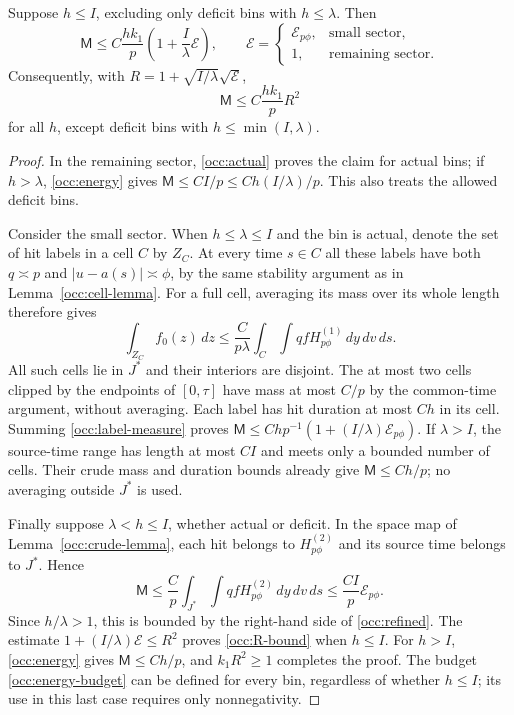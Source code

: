 \begin{proposition}\label{occ:refined-proposition}
Suppose $h\leq I$, excluding only deficit bins with $h\leq\lambda$.
Then
\begin{equation}\label{occ:refined}
 \mathsf M\leq C\frac{hk_1}{p}
             \left(1+\frac I\lambda\mathcal E\right),
 \qquad
 \mathcal E=\begin{cases}
  \mathcal E_{p\phi},&\text{small sector},\\
  1,&\text{remaining sector}.
 \end{cases}
\end{equation}
Consequently, with
$R=1+\sqrt{I/\lambda}\sqrt{\mathcal E}$,
\begin{equation}\label{occ:R-bound}
 \mathsf M\leq C\frac{hk_1}{p}R^2
\end{equation}
for all $h$, except deficit bins with $h\leq\min(I,\lambda)$.
\end{proposition}

\begin{proof}
In the remaining sector, \eqref{occ:actual} proves the claim for actual
bins; if $h>\lambda$, \eqref{occ:energy} gives
$\mathsf M\leq CI/p\leq Ch(I/\lambda)/p$. This also treats the allowed
deficit bins.

Consider the small sector. When $h\leq\lambda\leq I$ and the bin is
actual, denote the set of hit labels in a cell $C$ by $Z_C$. At every
time $s\in C$ all these labels have both $q\asymp p$ and
$|u-a(s)|\asymp\phi$, by the same stability argument as in
Lemma~\ref{occ:cell-lemma}. For a full cell, averaging its mass over its
whole length therefore gives
\[
 \int_{Z_C}f_0(z)\,dz
 \leq\frac C{p\lambda}\int_C\int qf
                  H^{(1)}_{p\phi}\,dy\,dv\,ds.
\]
All such cells lie in $J^*$ and their interiors are disjoint. The at most
two cells clipped by the endpoints of $[0,\tau]$ have mass at most $C/p$
by the common-time argument, without averaging. Each label has hit
duration at most $Ch$ in its cell. Summing
\eqref{occ:label-measure} proves
$\mathsf M\leq Chp^{-1}(1+(I/\lambda)\mathcal E_{p\phi})$.
If $\lambda>I$, the source-time range has length at most $CI$ and meets
only a bounded number of cells. Their crude mass and duration bounds
already give $\mathsf M\leq Ch/p$; no averaging outside $J^*$ is used.

Finally suppose $\lambda<h\leq I$, whether actual or deficit. In the
space map of Lemma~\ref{occ:crude-lemma}, each hit belongs to
$H^{(2)}_{p\phi}$ and its source time belongs to $J^*$. Hence
\[
 \mathsf M\leq\frac C p\int_{J^*}\int qf
                    H^{(2)}_{p\phi}\,dy\,dv\,ds
       \leq\frac{CI}p\mathcal E_{p\phi}.
\]
Since $h/\lambda>1$, this is bounded by the right-hand side of
\eqref{occ:refined}.
The estimate $1+(I/\lambda)\mathcal E\leq R^2$ proves
\eqref{occ:R-bound} when $h\leq I$. For $h>I$,
\eqref{occ:energy} gives $\mathsf M\leq Ch/p$, and
$k_1R^2\geq1$ completes the proof. The budget
\eqref{occ:energy-budget} can be defined for every bin, regardless of
whether $h\leq I$; its use in this last case requires only nonnegativity.
\end{proof}
